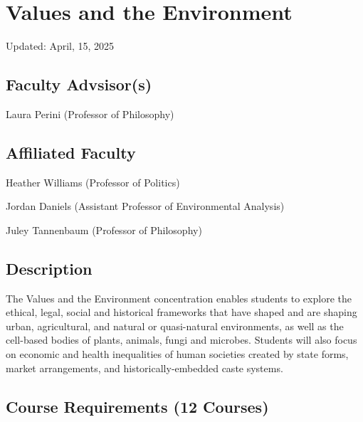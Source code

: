 \documentclass{article}\usepackage[]{graphicx}\usepackage[]{xcolor}
\newenvironment{itemize*}%
  {\begin{itemize}%
    \setlength{\itemsep}{0pt}%
    \setlength{\parskip}{0pt}}%
  {\end{itemize}}
\begin{document}
\newpage
\section{Values and the Environment}
Updated: April, 15, 2025



\subsection{Faculty Advsisor(s)}

\begin{itemize*}
  \item Laura Perini (Professor of Philosophy)
\end{itemize*}

\subsection{Affiliated Faculty}

\begin{itemize*}
  \item Heather Williams (Professor of Politics)
  \item Jordan Daniels (Assistant Professor of Environmental Analysis)
  \item Juley Tannenbaum (Professor of Philosophy)
\end{itemize*}

\subsection{Description}

The Values and the Environment concentration enables students to explore the ethical, legal, social and historical frameworks that have shaped and are shaping urban, agricultural, and natural or quasi-natural environments, as well as the cell-based bodies of plants, animals, fungi and microbes. Students will also focus on economic and health inequalities of human societies created by state forms, market arrangements, and historically-embedded caste systems.

\subsection{Course Requirements (12 Courses)}
\end{document}
